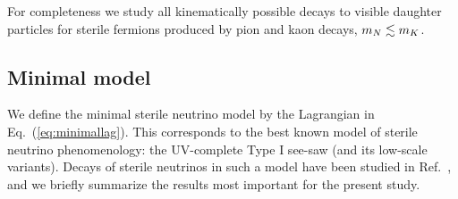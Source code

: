 \documentclass[11pt, a4paper]{article}
\newcommand{\refeq}[1]{Eq.~(\ref{#1})}
\newcommand{\reffig}[1]{Fig.~\ref{#1}}
\newcommand{\refref}[1]{Ref.~\cite{#1}}
\def\ster{\ensuremath N}
\begin{document}
For completeness we study all kinematically possible decays to visible daughter
particles for sterile fermions produced by pion and kaon decays, $m_{\ster}
\lesssim m_K$. 

%
%
%
%
\subsection{Minimal model}

We define the minimal sterile neutrino model by the Lagrangian in
\refeq{eq:minimallag}. This corresponds to the best known model of sterile
neutrino phenomenology: the UV-complete Type I see-saw (and its low-scale
variants). Decays of sterile neutrinos in such a model have been studied in
\refref{Atre:2009rg}, and we briefly summarize the results most important for
the present study.
\end{document}
